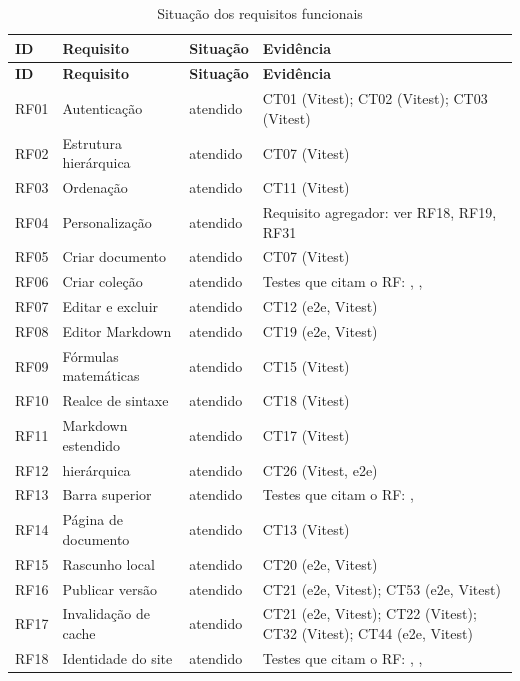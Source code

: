 \begin{longtable}{@{}L{1.4cm}L{4.4cm}L{2.4cm}L{5.4cm}@{}}
\caption{Situação dos requisitos funcionais}\label{tab:res-rf}\\
\toprule
\textbf{ID} & \textbf{Requisito} & \textbf{Situação} & \textbf{Evidência}\\
\midrule
\endfirsthead
\toprule
\textbf{ID} & \textbf{Requisito} & \textbf{Situação} & \textbf{Evidência}\\
\midrule
\endhead
\bottomrule
\endfoot
RF01 & Autenticação & atendido & CT01 (Vitest); CT02 (Vitest); CT03 (Vitest)\\
RF02 & Estrutura hierárquica & atendido & CT07 (Vitest)\\
RF03 & Ordenação & atendido & CT11 (Vitest)\\
RF04 & Personalização & atendido & Requisito agregador: ver RF18, RF19, RF31\\
RF05 & Criar documento & atendido & CT07 (Vitest)\\
RF06 & Criar coleção & atendido & Testes que citam o RF: , , \\
RF07 & Editar e excluir & atendido & CT12 (e2e, Vitest)\\
RF08 & Editor Markdown & atendido & CT19 (e2e, Vitest)\\
RF09 & Fórmulas matemáticas & atendido & CT15 (Vitest)\\
RF10 & Realce de sintaxe & atendido & CT18 (Vitest)\\
RF11 & Markdown estendido & atendido & CT17 (Vitest)\\
RF12 &  hierárquica & atendido & CT26 (Vitest, e2e)\\
RF13 & Barra superior & atendido & Testes que citam o RF: , \\
RF14 & Página de documento & atendido & CT13 (Vitest)\\
RF15 & Rascunho local & atendido & CT20 (e2e, Vitest)\\
RF16 & Publicar versão & atendido & CT21 (e2e, Vitest); CT53 (e2e, Vitest)\\
RF17 & Invalidação de cache & atendido & CT21 (e2e, Vitest); CT22 (Vitest); CT32 (Vitest); CT44 (e2e, Vitest)\\
RF18 & Identidade do site & atendido & Testes que citam o RF: , , \\

\end{longtable}
